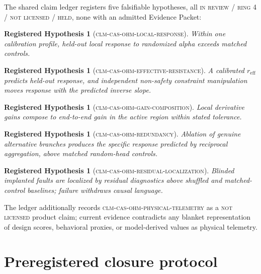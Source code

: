 \documentclass[11pt]{amsart}
\newtheorem{hypothesis}[theorem]{Registered Hypothesis}
\theoremstyle{definition}
\theoremstyle{remark}
\begin{document}
The shared claim ledger registers five falsifiable hypotheses, all \textsc{in review / ring 4 / not licensed / held}, none with an admitted Evidence Packet:

\begin{hypothesis}[\textsc{clm-cas-ohm-local-response}]
Within one calibration profile, held-out local response to randomized alpha exceeds matched controls.
\end{hypothesis}
\begin{hypothesis}[\textsc{clm-cas-ohm-effective-resistance}]
A calibrated $r_{\mathrm{eff}}$ predicts held-out response, and independent non-safety constraint manipulation moves response with the predicted inverse slope.
\end{hypothesis}
\begin{hypothesis}[\textsc{clm-cas-ohm-gain-composition}]
Local derivative gains compose to end-to-end gain in the active region within stated tolerance.
\end{hypothesis}
\begin{hypothesis}[\textsc{clm-cas-ohm-redundancy}]
Ablation of genuine alternative branches produces the specific response predicted by reciprocal aggregation, above matched random-head controls.
\end{hypothesis}
\begin{hypothesis}[\textsc{clm-cas-ohm-residual-localization}]
Blinded implanted faults are localized by residual diagnostics above shuffled and matched-control baselines; failure withdraws causal language.
\end{hypothesis}

The ledger additionally records \textsc{clm-cas-ohm-physical-telemetry} as a \textsc{not licensed} product claim; current evidence contradicts any blanket representation of design scores, behavioral proxies, or model-derived values as physical telemetry.

\section{Preregistered closure protocol}\label{sec:prereg}
\end{document}
